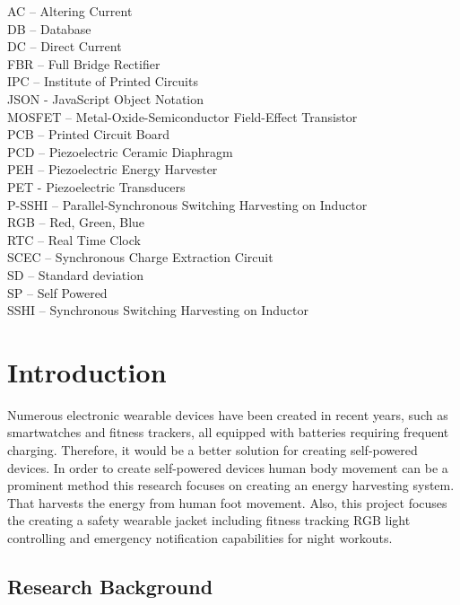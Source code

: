 \documentclass[11pt]{report}	%
\begin{document}
AC – Altering Current\\[2pt]
DB – Database\\[2pt]
DC – Direct Current\\[2pt]
FBR – Full Bridge Rectifier\\[2pt]
IPC – Institute of Printed Circuits\\[2pt]
JSON - JavaScript Object Notation\\[2pt]
MOSFET – Metal-Oxide-Semiconductor Field-Effect Transistor\\[2pt]
PCB – Printed Circuit Board\\[2pt]
PCD – Piezoelectric Ceramic Diaphragm\\[2pt]
PEH – Piezoelectric Energy Harvester\\[2pt]
PET - Piezoelectric Transducers\\[2pt]
P-SSHI – Parallel-Synchronous Switching Harvesting on Inductor\\[2pt]
RGB – Red, Green, Blue\\[2pt]
RTC – Real Time Clock\\[2pt]
SCEC – Synchronous Charge Extraction Circuit\\[2pt]
SD – Standard deviation\\[2pt]
SP – Self Powered\\[2pt]
SSHI – Synchronous Switching Harvesting on Inductor\\[2pt]


\clearpage


\newpage

\chapter{Introduction} %

Numerous electronic wearable devices have been created in recent years, such as smartwatches and fitness trackers, all equipped with batteries requiring frequent charging. Therefore, it would be a better solution for creating self-powered devices. In order to create self-powered devices human body movement can be a prominent method this research focuses on creating an energy harvesting system. That harvests the energy from human foot movement.
Also, this project focuses the creating a safety wearable jacket including fitness tracking RGB light controlling and emergency notification capabilities for night workouts.


\section{Research Background}
\end{document}
